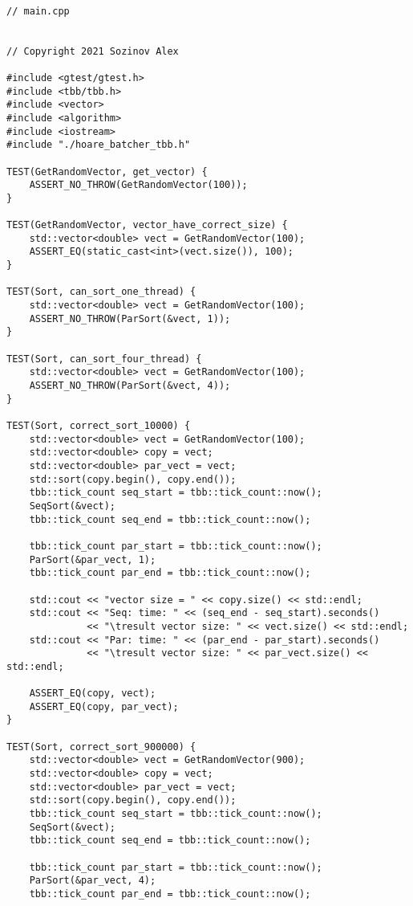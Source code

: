 \documentclass{report}
\begin{document}
\begin{lstlisting}

// main.cpp


// Copyright 2021 Sozinov Alex

#include <gtest/gtest.h>
#include <tbb/tbb.h>
#include <vector>
#include <algorithm>
#include <iostream>
#include "./hoare_batcher_tbb.h"

TEST(GetRandomVector, get_vector) {
    ASSERT_NO_THROW(GetRandomVector(100));
}

TEST(GetRandomVector, vector_have_correct_size) {
    std::vector<double> vect = GetRandomVector(100);
    ASSERT_EQ(static_cast<int>(vect.size()), 100);
}

TEST(Sort, can_sort_one_thread) {
    std::vector<double> vect = GetRandomVector(100);
    ASSERT_NO_THROW(ParSort(&vect, 1));
}

TEST(Sort, can_sort_four_thread) {
    std::vector<double> vect = GetRandomVector(100);
    ASSERT_NO_THROW(ParSort(&vect, 4));
}

TEST(Sort, correct_sort_10000) {
    std::vector<double> vect = GetRandomVector(100);
    std::vector<double> copy = vect;
    std::vector<double> par_vect = vect;
    std::sort(copy.begin(), copy.end());
    tbb::tick_count seq_start = tbb::tick_count::now();
    SeqSort(&vect);
    tbb::tick_count seq_end = tbb::tick_count::now();

    tbb::tick_count par_start = tbb::tick_count::now();
    ParSort(&par_vect, 1);
    tbb::tick_count par_end = tbb::tick_count::now();

    std::cout << "vector size = " << copy.size() << std::endl;
    std::cout << "Seq: time: " << (seq_end - seq_start).seconds()
              << "\tresult vector size: " << vect.size() << std::endl;
    std::cout << "Par: time: " << (par_end - par_start).seconds()
              << "\tresult vector size: " << par_vect.size() << std::endl;

    ASSERT_EQ(copy, vect);
    ASSERT_EQ(copy, par_vect);
}

TEST(Sort, correct_sort_900000) {
    std::vector<double> vect = GetRandomVector(900);
    std::vector<double> copy = vect;
    std::vector<double> par_vect = vect;
    std::sort(copy.begin(), copy.end());
    tbb::tick_count seq_start = tbb::tick_count::now();
    SeqSort(&vect);
    tbb::tick_count seq_end = tbb::tick_count::now();

    tbb::tick_count par_start = tbb::tick_count::now();
    ParSort(&par_vect, 4);
    tbb::tick_count par_end = tbb::tick_count::now();


\end{lstlisting}
\end{document}
